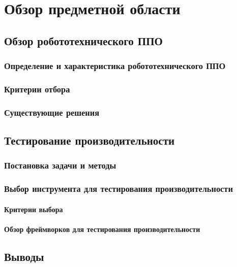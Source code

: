 \chapter{Обзор предметной области}
\label{title:chapter1}

\section{Обзор робототехнического ППО}
	\subsection{Определение и характеристика робототехнического ППО}
	\label{title:chapter1:robo_middleware_definition}
	
	
	\subsection{Критерии отбора}
	
	\label{title:chapter1:mars_criterias}
	
	\subsection{Существующие решения}
	
	\label{title:chapter1:mars_solutions}
	
\section{Тестирование производительности}
	\subsection{Постановка задачи и методы}
	\label{title:chapter1:performance_testing_approaches}
	
	
	\subsection{Выбор инструмента для тестирования производительности}
		\subsubsection{Критерии выбора}
		\label{title:chapter1:performance_testing_criterias}
		
		
		\subsubsection{Обзор фреймворков для тестирования производительности}
		\label{title:chapter1:performance_testing_benchmarks_review}
		
		
\section{Выводы}
\label{title:chapter1:conclusions}
